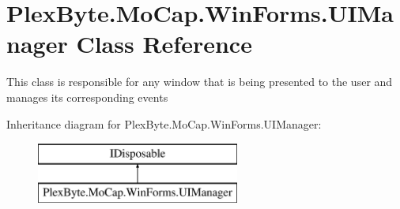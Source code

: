\hypertarget{class_plex_byte_1_1_mo_cap_1_1_win_forms_1_1_u_i_manager}{}\section{Plex\+Byte.\+Mo\+Cap.\+Win\+Forms.\+U\+I\+Manager Class Reference}
\label{class_plex_byte_1_1_mo_cap_1_1_win_forms_1_1_u_i_manager}


This class is responsible for any window that is being presented to the user and manages its corresponding events  


Inheritance diagram for Plex\+Byte.\+Mo\+Cap.\+Win\+Forms.\+U\+I\+Manager\+:\begin{figure}[H]
\begin{center}
\leavevmode
\includegraphics[height=2.000000cm]{class_plex_byte_1_1_mo_cap_1_1_win_forms_1_1_u_i_manager}
\end{center}
\end{figure}
